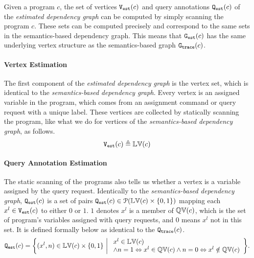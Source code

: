 Given a program $c$, the set of vertices $\mathtt{{V_{est}}}(c)$ and query annotations $\mathtt{{Q_{est}}}(c)$ of the \emph{estimated dependency graph} can be computed by simply
scanning the program $c$. These sets can be computed precisely and correspond to
the same sets in the semantics-based dependency graph.
This means that $\mathtt{{G_{est}}}(c)$ has the same underlying vertex structure as 
the semantics-based graph $\mathtt{{G_{trace}}}(c)$. 
\paragraph{Vertex Estimation}
The first component of the \emph{estimated dependency graph} is the vertex set, which is identical to the 
\emph{semantics-based dependency graph}.
Every vertex is an assigned variable in the program, which comes from an assignment command or query request with a unique label. 
These vertices are collected by statically scanning the program, like what we do for vertices of the \emph{semantics-based dependency graph}, as follows.
%
\[
 \mathtt{{V_{est}}}(c) \triangleq \mathbb{LV}(c)
\]

\paragraph{Query Annotation Estimation}
The static scanning of the programs also tells us whether a vertex is a variable assigned by the query request.
Identically to the 
\emph{semantics-based dependency graph}, $\mathtt{{Q_{est}}}(c)$ is
a set of pairs $\mathtt{{Q_{est}}}(c) \in \mathcal{P}(\mathbb{LV}(c) \times \{0, 1\} )$ 
mapping each $x^l \in \mathtt{{V_{est}}}(c)$ to either $0$ or $1$. 
$1$ denotes $x^{l}$ is a member of $ \mathbb{QV}(c)$, which is the set of program's variables assigned with query requests, 
and $0$ means $x^{l}$ not in this set. 
It is defined formally below as identical to the $\mathtt{{Q_{trace}}}(c)$.
%
\[
 \progF(c) =
 \left\{(x^l, n) 
\in \lvar(c) \times \{0, 1\} 
~ \middle\vert ~
\begin{array}{l}
 x^l \in \lvar(c) 
 \\ 
 \land n = 1 \Leftrightarrow x^l \in \qvar(c) \land n = 0 \Leftrightarrow x^l \notin \qvar(c)
\end{array}
\right\}.
\]